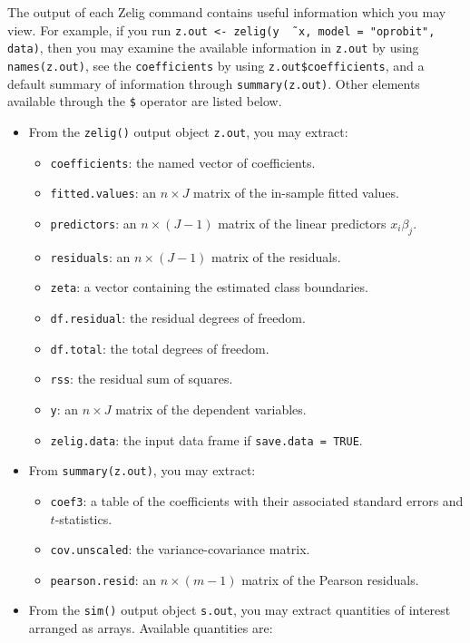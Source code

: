 The output of each Zelig command contains useful information which you
may view.  For example, if you run \texttt{z.out <- zelig(y \~\,
  x, model = "oprobit", data)}, then you may examine the available
information in \texttt{z.out} by using \texttt{names(z.out)},
see the {\tt coefficients} by using {\tt z.out\$coefficients}, and
a default summary of information through \texttt{summary(z.out)}.
Other elements available through the {\tt \$} operator are listed
below.

\begin{itemize}
\item From the {\tt zelig()} output object {\tt z.out}, you may
  extract:
   \begin{itemize}
   \item {\tt coefficients}: the named vector of coefficients.   
   \item {\tt fitted.values}: an $n \times J$ matrix of the in-sample
     fitted values.
   \item {\tt predictors}: an $n \times (J-1)$ matrix of the linear
     predictors $x_i \beta_j$.
   \item {\tt residuals}: an $n \times (J-1)$ matrix of the residuals. 
   \item {\tt zeta}: a vector containing the estimated class boundaries. 
   \item {\tt df.residual}: the residual degrees of freedom.  
   \item {\tt df.total}: the total degrees of freedom.
   \item {\tt rss}: the residual sum of squares.  
   \item {\tt y}: an $n \times J$ matrix of the dependent variables.
   \item {\tt zelig.data}: the input data frame if {\tt save.data = TRUE}.  
   \end{itemize}

\item From {\tt summary(z.out)}, you may extract:
\begin{itemize}
  \item {\tt coef3}: a table of the coefficients with their associated
    standard errors and $t$-statistics.
  \item {\tt cov.unscaled}: the variance-covariance matrix. 
  \item {\tt pearson.resid}: an $n \times (m-1)$ matrix of the Pearson residuals.  
\end{itemize}

 \item From the {\tt sim()} output object {\tt s.out}, you may extract
   quantities of interest arranged as arrays.  Available quantities
   are:


\end{itemize}
